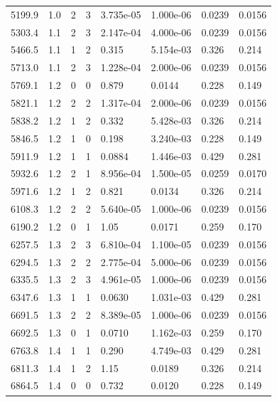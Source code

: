 \documentclass[preview]{standalone}
\begin{document}
{{{\begin{tabular}{L{1.2cm}C{1.2cm} C{0.3cm}C{0.5cm} C{1.4cm}C{1.4cm} C{1.4cm}C{1.4cm}}
  5199.9  &   1.0  & 2     &  3 &  3.735e-05  & 1.000e-06  & 0.0239 &  0.0156   \\ 
  5303.4  &   1.1  & 2     &  3 &  2.147e-04  & 4.000e-06  & 0.0239 &  0.0156   \\ 
  5466.5  &   1.1  & 1     &  2 &  0.315  & 5.154e-03  & 0.326 &  0.214   \\ 
  5713.0  &   1.1  & 2     &  3 &  1.228e-04  & 2.000e-06  & 0.0239 &  0.0156   \\ 
  5769.1  &   1.2  & 0     &  0 &  0.879  & 0.0144  & 0.228 &  0.149   \\ 
  5821.1  &   1.2  & 2     &  2 &  1.317e-04  & 2.000e-06  & 0.0239 &  0.0156   \\ 
  5838.2  &   1.2  & 1     &  2 &  0.332  & 5.428e-03  & 0.326 &  0.214   \\ 
  5846.5  &   1.2  & 1     &  0 &  0.198  & 3.240e-03  & 0.228 &  0.149   \\ 
  5911.9  &   1.2  & 1     &  1 &  0.0884  & 1.446e-03  & 0.429 &  0.281   \\ 
  5932.6  &   1.2  & 2     &  1 &  8.956e-04  & 1.500e-05  & 0.0259 &  0.0170   \\ 
  5971.6  &   1.2  & 1     &  2 &  0.821  & 0.0134  & 0.326 &  0.214   \\ 
  6108.3  &   1.2  & 2     &  2 &  5.640e-05  & 1.000e-06  & 0.0239 &  0.0156   \\ 
  6190.2  &   1.2  & 0     &  1 &  1.05  & 0.0171  & 0.259 &  0.170   \\ 
  6257.5  &   1.3  & 2     &  3 &  6.810e-04  & 1.100e-05  & 0.0239 &  0.0156   \\ 
  6294.5  &   1.3  & 2     &  2 &  2.775e-04  & 5.000e-06  & 0.0239 &  0.0156   \\ 
  6335.5  &   1.3  & 2     &  3 &  4.961e-05  & 1.000e-06  & 0.0239 &  0.0156   \\ 
  6347.6  &   1.3  & 1     &  1 &  0.0630  & 1.031e-03  & 0.429 &  0.281   \\ 
  6691.5  &   1.3  & 2     &  2 &  8.389e-05  & 1.000e-06  & 0.0239 &  0.0156   \\ 
  6692.5  &   1.3  & 0     &  1 &  0.0710  & 1.162e-03  & 0.259 &  0.170   \\ 
  6763.8  &   1.4  & 1     &  1 &  0.290  & 4.749e-03  & 0.429 &  0.281   \\ 
  6811.3  &   1.4  & 1     &  2 &  1.15  & 0.0189  & 0.326 &  0.214   \\ 
  6864.5  &   1.4  & 0     &  0 &  0.732  & 0.0120  & 0.228 &  0.149   \\ 

\end{tabular}}}}
\end{document}
